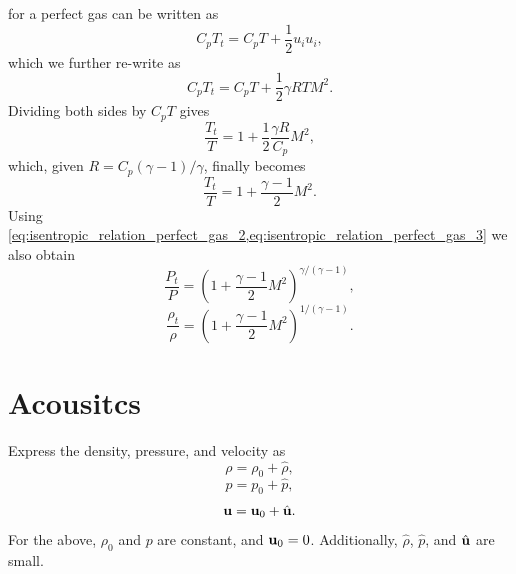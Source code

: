 \documentclass[oneside,a4paper,11pt]{report}
\begin{document}
 for a perfect gas can be written as
\begin{equation}
    C_p T_t = C_p T + \frac{1}{2} u_i u_i,
\end{equation}
which we further re-write as
\begin{equation}
    C_p T_t = C_p T + \frac{1}{2} \gamma R T M^2.
\end{equation}
Dividing both sides by $C_pT$ gives
\begin{equation}
    \frac{T_t}{T} = 1 + \frac{1}{2} \frac{\gamma R}{C_p} M^2,
\end{equation}
which, given $R = C_p (\gamma -1)/\gamma$, finally becomes
\begin{equation}
\label{eq:stagnation_temperature}
    \frac{T_t}{T} = 1 + \frac{\gamma - 1}{2} M^2.
\end{equation}
Using \cref{eq:isentropic_relation_perfect_gas_2,eq:isentropic_relation_perfect_gas_3} we also obtain
\begin{equation}
\label{eq:stagnation_pressure}
    \frac{P_t}{P} = \left ( 1 + \frac{\gamma -1}{2} M^2 \right)^{\gamma / (\gamma - 1)},
\end{equation}
\begin{equation}
\label{eq:stagnation_density}
    \frac{\rho_t}{\rho} = \left ( 1 + \frac{\gamma -1}{2} M^2 \right)^{1 / (\gamma - 1)}.
\end{equation}

%
\chapter{Acousitcs}
%

Express the density, pressure, and velocity as 
\begin{equation}
    \rho = \rho_0 + \hat{\rho},
\end{equation}
\begin{equation}
    p = p_0 + \hat{p},
\end{equation}
\begin{equation}
    \mathbf{u} = \mathbf{u}_0 + \hat{\mathbf{u}}.
\end{equation}
For the above, $\rho_0$ and $p$ are constant, and $\mathbf{u}_0 = 0$. Additionally, $\hat{\rho}$, $\hat{p}$, and $\hat{\mathbf{u}}$ are small.
\end{document}
